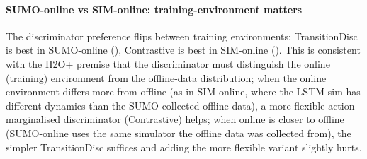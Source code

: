 \begin{table}[t]
\centering
\small
\caption{Ablation on SIM online (Group C), mean cumulative reward over 4--5 seeds. SIM-trained policies evaluated on the SUMO target environment. Bold: best.}
\label{tab:ablation_sim}
\end{table}

\paragraph{SUMO-online vs SIM-online: training-environment matters}
The discriminator preference flips between training environments: TransitionDisc is best in SUMO-online (), Contrastive is best in SIM-online ().
This is consistent with the H2O+ premise that the discriminator must distinguish the online (training) environment from the offline-data distribution; when the online environment differs more from offline (as in SIM-online, where the LSTM sim has different dynamics than the SUMO-collected offline data), a more flexible action-marginalised discriminator (Contrastive) helps; when online is closer to offline (SUMO-online uses the same simulator the offline data was collected from), the simpler TransitionDisc suffices and adding the more flexible variant slightly hurts.

